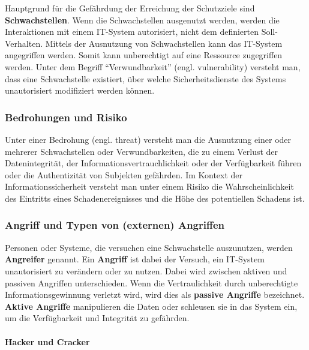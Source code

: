 Hauptgrund für die Gefährdung der Erreichung der Schutzziele sind \textbf{Schwachstellen}. Wenn die Schwachstellen ausgenutzt werden, werden die Interaktionen mit einem IT-System autorisiert, nicht dem definierten Soll-Verhalten. Mittels der Ausnutzung von Schwachstellen kann das IT-System angegriffen werden. Somit kann unberechtigt auf eine Ressource zugegriffen werden\cite[19--20]{nowey2011einleitung}. Unter dem Begriff "`Verwundbarkeit"' (engl. vulnerability) versteht man, dass eine Schwachstelle existiert, über welche Sicherheitsdienste des Systems unautorisiert modifiziert werden können\cite[38]{eckert2013sicherheit}.

\subsubsection{Bedrohungen und Risiko}

Unter einer Bedrohung (engl. threat) versteht man die Ausnutzung einer oder mehrerer Schwachstellen oder Verwundbarkeiten, die zu einem Verlust der Datenintegrität, der Informationsvertrauchlichkeit oder der Verfügbarkeit führen oder die Authentizität von Subjekten gefährden\cite[39]{eckert2013sicherheit}. Im Kontext der Informationssicherheit versteht man unter einem Risiko die Wahrscheinlichkeit des Eintritts eines Schadenereignisses und die Höhe des potentiellen Schadens ist\cite[15]{nowey2011einleitung}.

\subsubsection{Angriff und Typen von (externen) Angriffen}

Personen oder Systeme, die versuchen eine Schwachstelle auszunutzen, werden \textbf{Angreifer} genannt. Ein \textbf{Angriff} ist dabei der Versuch, ein IT-System unautorisiert zu verändern oder zu nutzen. Dabei wird zwischen aktiven und passiven Angriffen unterschieden. Wenn die Vertraulichkeit durch unberechtigte Informationsgewinnung verletzt wird, wird dies als \textbf{passive Angriffe} bezeichnet. \textbf{Aktive Angriffe} manipulieren die Daten oder schleusen sie in das System ein, um die Verfügbarkeit und Integrität zu gefährden\cite[20]{nowey2011einleitung}.

\paragraph{Hacker und Cracker}\mbox{}\\

